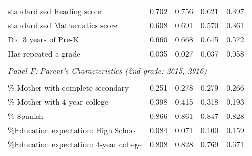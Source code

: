 {\begin{tabular}{lcccc}
standardized Reading score&       0.702&       0.756&       0.621&       0.397\\
standardized Mathematics score&       0.608&       0.691&       0.570&       0.361\\
Did 3 years of Pre-K&       0.660&       0.668&       0.645&       0.572\\
Has repeated a grade&       0.035&       0.027&       0.037&       0.058\\
&  &  &   \\
\multicolumn{4}{l}{\textit{Panel F: Parent's Characteristics (2nd grade: 2015, 2016)}} \\
            &            &            &            &            \\
\% Mother with complete secondary&       0.251&       0.278&       0.279&       0.266\\
\% Mother with 4-year college&       0.398&       0.415&       0.318&       0.193\\
\% Spanish  &       0.866&       0.861&       0.847&       0.828\\
\%Education expectation: High School&       0.084&       0.071&       0.100&       0.159\\
\%Education expectation: 4-year college&       0.808&       0.828&       0.769&       0.671\\

\bottomrule
\end{tabular}
}
